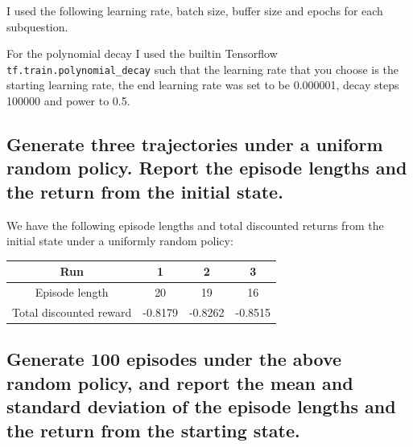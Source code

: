 \documentclass{article}
\begin{document}
I used the following learning rate, batch size, buffer size and epochs for each
subquestion.

\begin{center}
\end{center}

For the polynomial decay I used the builtin Tensorflow
\texttt{tf.train.polynomial\_decay} such that the learning rate that you choose
is the starting learning rate, the end learning rate was set to be 0.000001,
decay steps 100000 and power to 0.5.

\subsection{Generate three trajectories under a uniform random policy. Report
  the episode lengths and the return from the initial state.}

We have the following episode lengths and total discounted returns from the
initial state under a uniformly random policy:

\begin{center}
  \begin{tabular}{ |c|c|c|c| } 
    \hline
    Run  & 1 & 2 & 3 \\
    \hline
    Episode length & 20 & 19 & 16 \\ 
    Total discounted reward & -0.8179 & -0.8262 & -0.8515 \\
    \hline
  \end{tabular}
\end{center}

\subsection{Generate 100 episodes under the above random policy, and report the
  mean and standard deviation of the episode lengths and the return from the
  starting state.}
\end{document}
